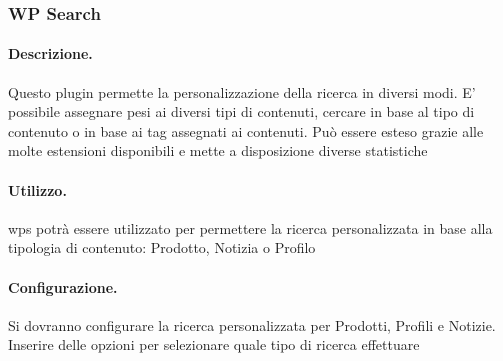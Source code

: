 \subsubsection{WP Search} \label{plugin:wps}
\paragraph{Descrizione.} Questo plugin permette la personalizzazione della ricerca in diversi modi. E' possibile assegnare pesi ai diversi tipi di contenuti, cercare in base al tipo di contenuto o in base ai tag assegnati ai contenuti. Può essere esteso grazie alle molte estensioni disponibili e mette a disposizione diverse statistiche
\paragraph{Utilizzo.} \gls{wps} potrà essere utilizzato per permettere la ricerca personalizzata in base alla tipologia di contenuto: Prodotto, Notizia o Profilo
\paragraph{Configurazione.} Si dovranno configurare la ricerca personalizzata per Prodotti, Profili e Notizie. Inserire delle opzioni per selezionare quale tipo di ricerca effettuare

